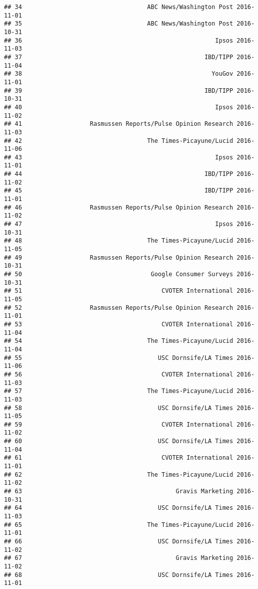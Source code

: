 \documentclass[]{article}
\begin{document}
\begin{verbatim}
## 34                                   ABC News/Washington Post 2016-11-01
## 35                                   ABC News/Washington Post 2016-10-31
## 36                                                      Ipsos 2016-11-03
## 37                                                   IBD/TIPP 2016-11-04
## 38                                                     YouGov 2016-11-01
## 39                                                   IBD/TIPP 2016-10-31
## 40                                                      Ipsos 2016-11-02
## 41                   Rasmussen Reports/Pulse Opinion Research 2016-11-03
## 42                                   The Times-Picayune/Lucid 2016-11-06
## 43                                                      Ipsos 2016-11-01
## 44                                                   IBD/TIPP 2016-11-02
## 45                                                   IBD/TIPP 2016-11-01
## 46                   Rasmussen Reports/Pulse Opinion Research 2016-11-02
## 47                                                      Ipsos 2016-10-31
## 48                                   The Times-Picayune/Lucid 2016-11-05
## 49                   Rasmussen Reports/Pulse Opinion Research 2016-10-31
## 50                                    Google Consumer Surveys 2016-10-31
## 51                                       CVOTER International 2016-11-05
## 52                   Rasmussen Reports/Pulse Opinion Research 2016-11-01
## 53                                       CVOTER International 2016-11-04
## 54                                   The Times-Picayune/Lucid 2016-11-04
## 55                                      USC Dornsife/LA Times 2016-11-06
## 56                                       CVOTER International 2016-11-03
## 57                                   The Times-Picayune/Lucid 2016-11-03
## 58                                      USC Dornsife/LA Times 2016-11-05
## 59                                       CVOTER International 2016-11-02
## 60                                      USC Dornsife/LA Times 2016-11-04
## 61                                       CVOTER International 2016-11-01
## 62                                   The Times-Picayune/Lucid 2016-11-02
## 63                                           Gravis Marketing 2016-10-31
## 64                                      USC Dornsife/LA Times 2016-11-03
## 65                                   The Times-Picayune/Lucid 2016-11-01
## 66                                      USC Dornsife/LA Times 2016-11-02
## 67                                           Gravis Marketing 2016-11-02
## 68                                      USC Dornsife/LA Times 2016-11-01

\end{verbatim}
\end{document}
